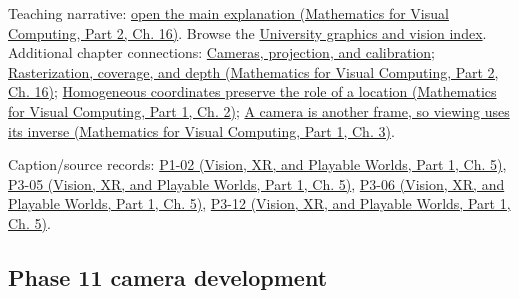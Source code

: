 Teaching narrative: \href{../02-Mathematics-for-Visual-Computing-P02/main.pdf\#nameddest=03-visual-computing-i-ch012-rasterization-coverage-and-depth}{open the main explanation (Mathematics for Visual Computing, Part 2, Ch. 16)}. Browse the \hyperref[appendix-a6d556a4ef50-university-graphics-vision-and-photography---independent-series]{University graphics and vision index}. Additional chapter connections: \hyperref[03-visual-computing-i-ch003-cameras-projection-and-calibration]{Cameras, projection, and calibration}; \href{../02-Mathematics-for-Visual-Computing-P02/main.pdf\#nameddest=03-visual-computing-i-ch012-rasterization-coverage-and-depth}{Rasterization, coverage, and depth (Mathematics for Visual Computing, Part 2, Ch. 16)}; \href{../02-Mathematics-for-Visual-Computing-P01/main.pdf\#nameddest=01-foundations-i-ch018-homogeneous-coordinates-preserve-the-role-of-a-location}{Homogeneous coordinates preserve the role of a location (Mathematics for Visual Computing, Part 1, Ch. 2)}; \href{../02-Mathematics-for-Visual-Computing-P01/main.pdf\#nameddest=01-foundations-i-ch019-a-camera-is-another-frame-so-viewing-uses-its-inverse}{A camera is another frame, so viewing uses its inverse (Mathematics for Visual Computing, Part 1, Ch. 3)}.

Caption/source records: \href{../07-Vision-XR-and-Playable-Worlds-P01/main.pdf\#nameddest=04-visual-computing-ii-ch036-p1-02---module-1.2-course-intro-administrivia-part-2-graphics-visual-computing-2026}{P1-02 (Vision, XR, and Playable Worlds, Part 1, Ch. 5)}, \href{../07-Vision-XR-and-Playable-Worlds-P01/main.pdf\#nameddest=04-visual-computing-ii-ch036-p3-05---the-camera-transform}{P3-05 (Vision, XR, and Playable Worlds, Part 1, Ch. 5)}, \href{../07-Vision-XR-and-Playable-Worlds-P01/main.pdf\#nameddest=04-visual-computing-ii-ch036-p3-06---clipping}{P3-06 (Vision, XR, and Playable Worlds, Part 1, Ch. 5)}, \href{../07-Vision-XR-and-Playable-Worlds-P01/main.pdf\#nameddest=04-visual-computing-ii-ch036-p3-12---scan-conversion}{P3-12 (Vision, XR, and Playable Worlds, Part 1, Ch. 5)}.

\subsection{Phase 11 camera development}\label{appendix-40426e4b2103-phase-11-camera-development}

\hypertarget{appendix-40426e4b2103-phase-11-camera-development}{}

